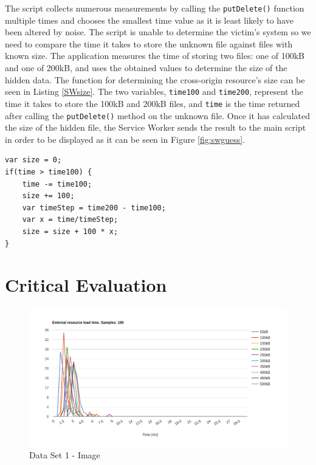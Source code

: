 \documentclass[10pt,a4paper,twoside]{book}
\begin{document}
The script collects numerous measurements by calling the \texttt{putDelete()} function multiple times and chooses the smallest time value as it is least likely to have been altered by noise. The script is unable to determine the victim's system so we need to compare the time it takes to store the unknown file against files with known size. The application measures the time of storing two files: one of 100kB and one of 200kB, and uses the obtained values to determine the size of the hidden data. The function for determining the cross-origin resource's size can be seen in Listing \ref{SWsize}. The two variables, \texttt{time100} and \texttt{time200}, represent the time it takes to store the 100kB and 200kB files, and \texttt{time} is the time returned after calling the \texttt{putDelete()} method on the unknown file. Once it has calculated the size of the hidden file, the Service Worker sends the result to the main script in order to be displayed as it can be seen in Figure \ref{fig:swguess}.

\begin{lstlisting}[caption={JavaScript code for estimating the size of a file.},label={SWsize}]
var size = 0;
if(time > time100) {
    time -= time100;
    size += 100;
    var timeStep = time200 - time100;
    var x = time/timeStep;
    size = size + 100 * x;
}
\end{lstlisting}


\chapter{Critical Evaluation}
\label{chap:evaluation}

\begin{figure}[h]
\centering
\includegraphics[width=\textwidth]{figures/i100L50H.png}
\caption{Data Set 1 - Image}
\label{fig:videointerface}
\end{figure}
\end{document}
